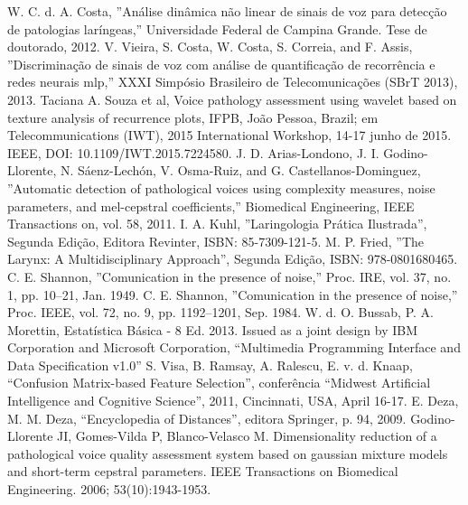 \documentclass[a4paper,12pt,oneside]{report}
\begin{document}
\begin{thebibliography}{9}
W. C. d. A. Costa, ''An\'{a}lise din\^{a}mica n\~{a}o linear de sinais de voz para detec\c{c}\~{a}o de patologias lar\'{i}ngeas,''
Universidade Federal de Campina Grande. Tese de doutorado, 2012.
V. Vieira, S. Costa, W. Costa, S. Correia, and F. Assis, ''Discrimina\c{c}\~{a}o de sinais de voz com an\'{a}lise de quantifica\c{c}\~{a}o de recorr\^{e}ncia e redes neurais mlp,'' XXXI Simp\'{o}sio Brasileiro de Telecomunica\c{c}\~{o}es (SBrT 2013), 2013.
Taciana A. Souza et al, Voice pathology assessment using wavelet based on texture analysis of recurrence plots, IFPB, Jo\~{a}o Pessoa, Brazil; em Telecommunications (IWT), 2015 International Workshop, 14-17 junho de 2015.  IEEE, DOI: 10.1109/IWT.2015.7224580.
J. D. Arias-Londono, J. I. Godino-Llorente, N. S\'{a}enz-Lech\'{o}n, V. Osma-Ruiz, and G. Castellanos-Dominguez, ''Automatic detection of pathological voices using complexity measures, noise parameters, and mel-cepstral coefficients,'' Biomedical Engineering, IEEE Transactions on, vol. 58, 2011.
I. A. Kuhl, ''Laringologia Pr\'{a}tica Ilustrada'', Segunda Edi\c{c}\~{a}o, Editora Revinter, ISBN: 85-7309-121-5.
M. P. Fried, ''The Larynx: A Multidisciplinary Approach'', Segunda Edi\c{c}\~{a}o, ISBN: 978-0801680465.
C. E. Shannon, ''Comunication in the presence of noise,'' Proc. IRE, vol. 37, no. 1, pp. 10–21, Jan. 1949.
C. E. Shannon, ''Comunication in the presence of noise,'' Proc. IEEE, vol. 72, no. 9, pp. 1192–1201, Sep. 1984.
W. d. O. Bussab, P. A. Morettin, Estat\'{i}stica B\'{a}sica - 8 Ed. 2013.
Issued as a joint design by IBM Corporation and Microsoft Corporation, \enquote{Multimedia Programming Interface and Data Specification v1.0}
S. Visa, B. Ramsay, A. Ralescu, E. v. d. Knaap, \enquote{Confusion Matrix-based Feature Selection}, confer\^{e}ncia \enquote{Midwest Artificial Intelligence and Cognitive Science}, 2011, Cincinnati, USA, April 16-17.
E. Deza, M. M. Deza, \enquote{Encyclopedia of Distances}, editora Springer, p. 94, 2009.
 Godino-Llorente JI, Gomes-Vilda P, Blanco-Velasco M. Dimensionality reduction of a pathological voice quality assessment system based on gaussian mixture models and short-term cepstral parameters. IEEE Transactions on Biomedical Engineering. 2006; 53(10):1943-1953. 

\end{thebibliography}
\end{document}
